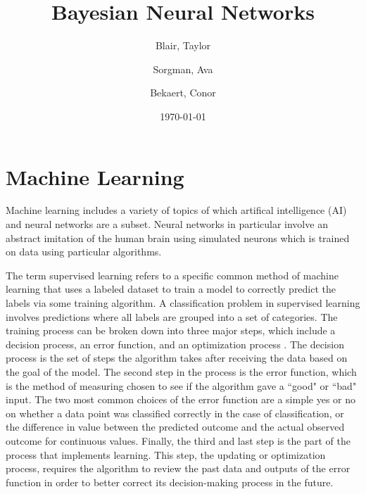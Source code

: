 \documentclass[12pt]{article}
\title{Bayesian Neural Networks}
\author{
	Blair, Taylor
	\and
	Sorgman, Ava
	\and
	Bekaert, Conor
}
\date{\today}
\begin{document}
\doublespacing
\maketitle




\tableofcontents

	
\section{Machine Learning}
	
Machine learning includes a variety of topics of which artifical intelligence (AI) and neural networks are a subset. Neural networks in particular involve an abstract imitation of the human brain using simulated neurons which is trained on data using particular algorithms. 

The term supervised learning refers to a specific common method of machine learning that uses a labeled dataset to train a model to correctly predict the labels via some training algorithm. A classification problem in supervised learning involves predictions where all labels are grouped into a set of categories. The training process can be broken down into three major steps, which include a decision process, an error function, and an optimization process \cite{berkelyWhatIsML}. The decision process is the set of steps the algorithm takes after receiving the data based on the goal of the model. The second step in the process is the error function, which is the method of measuring chosen to see if the algorithm gave a ``good" or ``bad" input. The two most common choices of the error function are a simple yes or no on whether a data point was classified correctly in the case of classification, or the difference in value between the predicted outcome and the actual observed outcome for continuous values. Finally, the third and last step is the part of the process that implements learning. This step, the updating or optimization process, requires the algorithm to review the past data and outputs of the error function in order to better correct its decision-making process in the future.
\end{document}
